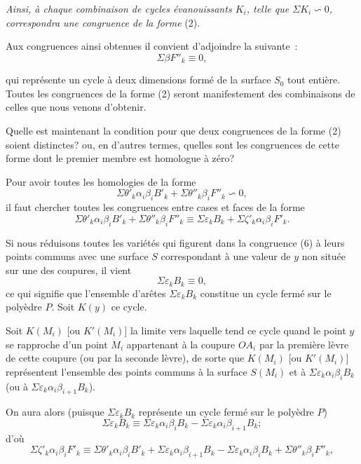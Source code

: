 \documentclass{article}
\begin{document}
\emph{Ainsi, à chaque combinaison de cycles évanouissants $K_{i}$, telle que $\Sigma K_{i} \backsim 0$, correspondra une congruence de la forme} (2).

Aux congruences ainsi obtenues il convient d'adjoindre la suivante~:
\[ \Sigma \beta F''_{k} \equiv 0, \]

qui représente un cycle à deux dimensions formé de la surface $S_{0}$ tout entière. Toutes les congruences de la forme (2) seront manifestement des combinaisons de celles que nous venons d'obtenir.

Quelle est maintenant la condition pour que deux congruences de la forme (2) soient distinctes? ou, en d'autres termes, quelles sont les congruences de cette forme dont le premier membre est homologue à zéro?

Pour avoir toutes les homologies de la forme
\[ \Sigma \theta'_{k} \alpha_{i}\beta_{i}B'_{k} + \Sigma \theta''_{k} \beta_{i}F''_{k} \backsim 0, \]
il faut chercher toutes les congruences entre cases et faces de la forme
\[ \Sigma \theta'_{k} \alpha_{i}\beta_{i}B'_{k} + \Sigma \theta''_{k} \beta_{i}F''_{k} \equiv \Sigma \varepsilon_{k} B_{k} + \Sigma \zeta'_{k} \alpha_{i}\beta_{i}F'_{k}. \tag{6} \]

Si nous réduisons toutes les variétés qui figurent dans la congruence (6) à leurs points communs avec une surface $S$ correspondant à une valeur de $y$ non située sur une des coupures, il vient
\[ \Sigma \varepsilon_{k} B_{k} \equiv 0, \]
ce qui signifie que l'ensemble d'arêtes $\Sigma \varepsilon_{k} B_{k}$ constitue un cycle fermé sur le polyèdre $P$. Soit $K(y)$ ce cycle.

Soit $K(M_{i})$ [ou $K'(M_{i})$] la limite vers laquelle tend ce cycle quand le point $y$ se rapproche d'un point $M_{i}$ appartenant à la coupure $OA_{i}$ par la première lèvre de cette coupure (ou par la seconde lèvre), de sorte que $K(M_{i})$ [ou $K'(M_{i})$] représentent l'ensemble des points communs à la surface $S(M_{i})$ et à $\Sigma \varepsilon_{k} \alpha_{i}\beta_{i}B_{k}$ (ou à $\Sigma \varepsilon_{k} \alpha_{i}\beta_{i+1}B_{k}$).

On aura alors (puisque $\Sigma \varepsilon_{k} B_{k}$ représente un cycle fermé sur le polyèdre $P$)
\[ \Sigma \varepsilon_{k} B_{k} \equiv \Sigma \varepsilon_{k} \alpha_{i}\beta_{i}B_{k} - \Sigma \varepsilon_{k} \alpha_{i}\beta_{i+1}B_{k}; \tag{7} \]
d'où
\[ \Sigma \zeta'_{k} \alpha_{i}\beta_{i}F'_{k} \equiv \Sigma \theta'_{k} \alpha_{i}\beta_{i}B'_{k} + \Sigma \varepsilon_{k} \alpha_{i}\beta_{i+1}B_{k} - \Sigma \varepsilon_{k} \alpha_{i}\beta_{i}B_{k} + \Sigma \theta''_{k} \beta_{i}F''_{k}, \tag{8} \]
\end{document}
